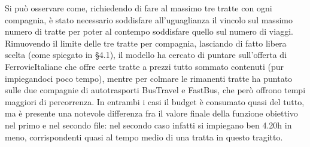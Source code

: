 \documentclass[main.tex]{subfiles}
\begin{document}
Si può osservare come, richiedendo di fare al massimo tre tratte con ogni compagnia, è stato necessario soddisfare all'uguaglianza 
il vincolo sul massimo numero di tratte per poter al contempo soddisfare quello sul numero di viaggi. Rimuovendo il limite delle tre tratte per compagnia,
lasciando di fatto libera scelta (come spiegato in §4.1), il modello ha cercato di puntare sull'offerta di FerrovieItaliane che offre certe tratte a prezzi 
tutto sommato contenuti (pur impiegandoci poco tempo), mentre per colmare le rimanenti tratte ha puntato sulle due compagnie di autotrasporti BusTravel e FastBus, 
che però offrono tempi maggiori di percorrenza. In entrambi i casi il budget è consumato quasi del tutto, ma è presente una notevole differenza fra il valore finale 
della funzione obiettivo nel primo e nel secondo file: nel secondo caso infatti si impiegano ben 4.20h in meno, corrispondenti quasi al tempo medio di una tratta in 
questo tragitto.
\end{document}
